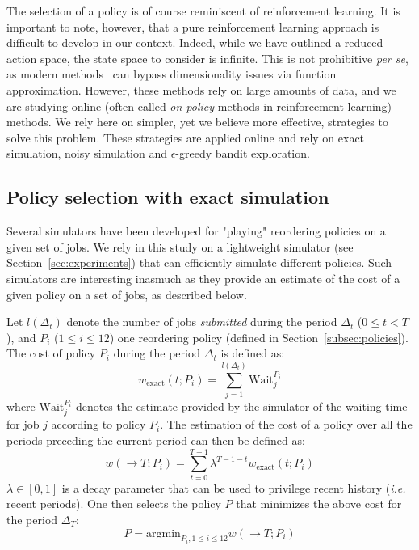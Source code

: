 \documentclass[sigconf,anonymous]{acmart}
\begin{document}
The selection of a policy is of course reminiscent of reinforcement learning.
It is important to note, however, that a pure reinforcement learning approach
is difficult to develop in our context. Indeed, while we have outlined a
reduced action space, the state space to consider is infinite. This is not
prohibitive \textit{per se}, as modern methods~\cite{aprl}
can bypass dimensionality issues via function approximation. However, these
methods rely on large amounts of data, and we are studying online (often called
\textit{on-policy} methods in reinforcement learning) methods. We rely here on
simpler, yet we believe more effective, strategies to solve this problem.
These strategies are applied online and rely on exact simulation, noisy
simulation and $\epsilon$-greedy bandit exploration.

\subsection{Policy selection with exact simulation}
\label{sub:feedback}

Several simulators have been developed for "playing" reordering policies on a
given set of jobs. We rely in this study on a lightweight simulator (see
Section~\ref{sec:experiments}) that can efficiently simulate different
policies. Such simulators are interesting inasmuch as they provide an estimate
of the cost of a given policy on a set of jobs, as described below.

Let $l(\Delta_t)$ denote the number of jobs \textit{submitted} during the
period $\Delta_t$ ($0 \le t < T$), and $P_i$ ($1 \le i \le 12$) one reordering
policy (defined in Section~\ref{subsec:policies}). The cost of policy $P_i$
during the period $\Delta_t$ is defined as:
%
\begin{equation} \label{eq:cost-exact} w_{\mbox{exact}}(t;P_i) =
\sum_{j=1}^{l(\Delta_t)} \mbox{Wait}_j^{P_i} \end{equation}
%
where $\mbox{Wait}_j^{P_i}$ denotes the estimate provided by the simulator of
the waiting time for job $j$ according to policy $P_i$. The estimation of the
cost of a policy over all the periods preceding the current period can then be
defined as:
%
\begin{equation} \label{eq:tot-cost-exact} w(\rightarrow T;P_i) =
\sum_{t=0}^{T-1} \lambda^{T-1-t} w_{\mbox{exact}}(t;P_i) \end{equation}
%
$\lambda \in [0,1]$ is a decay parameter that can be used to privilege recent
history (\textit{i.e.} recent periods). One then selects the policy $P$ that
minimizes the above cost for the period $\Delta_T$:
%
\begin{equation} \label{eq:select-exact} P = \mbox{argmin}_{P_i, 1 \le i \le
12} w(\rightarrow T;P_i) \end{equation}
\end{document}

